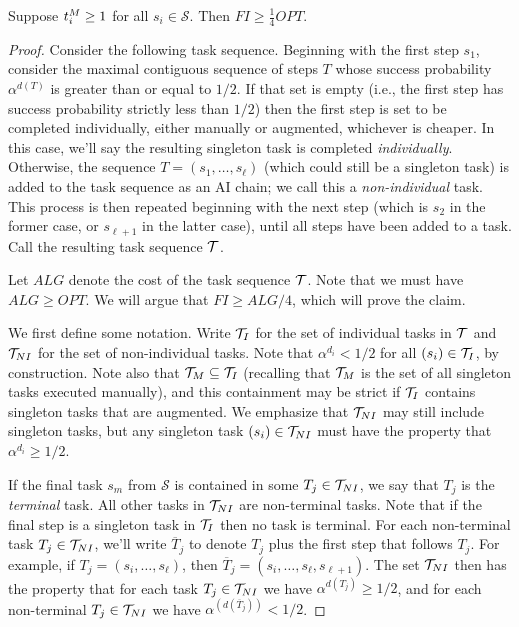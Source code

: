 \begin{proposition}
\label{prop:FI.lower.bound.4}
    Suppose $t^{M}_{i} \geq 1$ for all $s_i \in \mathcal{S}$. 
    Then $FI \geq \tfrac{1}{4}OPT$.
\end{proposition}
\begin{proof}

    Consider the following task sequence.  
    Beginning with the first step $s_1$, consider the maximal contiguous sequence of steps $T$ whose success probability $\alpha^{d(T)}$ is greater than or equal to $1/2$.  
    If that set is empty (i.e., the first step has success probability strictly less than $1/2$) then the first step is set to be completed individually, either manually or augmented, whichever is cheaper.  
    In this case, we'll say the resulting singleton task is completed \emph{individually}. 
    Otherwise, the sequence $T = (s_1, \dotsc, s_\ell)$ (which could still be a singleton task) is added to the task sequence as an AI chain; we call this a \emph{non-individual} task.  
    This process is then repeated beginning with the next step (which is $s_2$ in the former case, or $s_{\ell+1}$ in the latter case), until all steps have been added to a task.  
    Call the resulting task sequence $\mathcal{T}$.

    \medskip
    
    Let $ALG$ denote the cost of the task sequence $\mathcal{T}$.  
    Note that we must have $ALG \geq OPT$. 
    We will argue that $FI \geq ALG/4$, which will prove the claim.

    \medskip

    We first define some notation.  
    Write $\mathcal{T}_I$ for the set of individual tasks in $\mathcal{T}$ and $\mathcal{T}_{NI}$ for the set of non-individual tasks.
    Note that $\alpha^{d_i} < 1/2$ for all $(s_i) \in \mathcal{T}_I$, by construction.  
    Note also that $\mathcal{T}_{M} \subseteq \mathcal{T}_I$ (recalling that $\mathcal{T}_{M}$ is the set of all singleton tasks executed manually), and this containment may be strict if $\mathcal{T}_I$ contains singleton tasks that are augmented.  
    We emphasize that $\mathcal{T}_{NI}$ may still include singleton tasks, but any singleton task $(s_i) \in \mathcal{T}_{NI}$ must have the property that $\alpha^{d_i} \geq 1/2$.
 
    If the final task $s_m$ from $\mathcal{S}$ is contained in some $T_j \in \mathcal{T}_{NI}$, we say that $T_j$ is the \emph{terminal} task.  
    All other tasks in $\mathcal{T}_{NI}$ are non-terminal tasks.  Note that if the final step is a singleton task in $\mathcal{T}_I$ then no task is terminal.  
    For each non-terminal task $T_j \in \mathcal{T}_{NI}$, we'll write $\overline{T}_j$ to denote $T_j$ plus the first step that follows $T_j$. 
    For example, if $T_j = (s_i, \dotsc, s_\ell)$, then $\overline{T}_j = (s_i, \dotsc, s_\ell, s_{\ell+1})$.
    The set $\mathcal{T}_{NI}$ then has the property that for each task $T_j \in \mathcal{T}_{NI}$ we have $\alpha^{d(T_j)} \geq 1/2$, and for each non-terminal $T_j \in \mathcal{T}_{NI}$ we have $\alpha^{(d(\overline{T}_j))} < 1/2$.


\end{proof}

